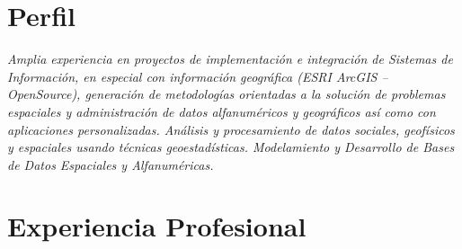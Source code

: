 \documentclass[]{friggeri-cv}
\begin{document}
\section{Perfil}
\emph{Amplia experiencia en proyectos de implementación e integración de Sistemas de Información, en especial con información geográfica (ESRI ArcGIS – OpenSource), generación de metodologías orientadas a la solución de problemas espaciales y administración de datos alfanuméricos y geográficos así como con aplicaciones personalizadas. Análisis y procesamiento de datos sociales, geofísicos y espaciales usando técnicas geoestadísticas. Modelamiento y Desarrollo de Bases de Datos Espaciales y Alfanuméricas.}
\\

\section{Experiencia Profesional}
\end{document}
